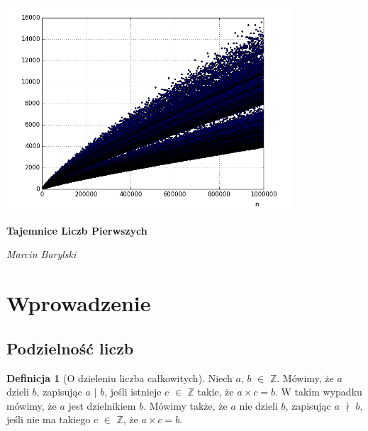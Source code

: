 \documentclass[10pt,onecolumn]{article}
\theoremstyle{definition}
\newtheorem{definition}{Definicja}
\theoremstyle{hypothesis}
\theoremstyle{capability}
\begin{document}

\begin{titlepage}
	\centering
	\includegraphics[width=0.8\textwidth]{title_page}\par\vspace{1cm}
	\vspace{1.5cm}
	{\huge\bfseries Tajemnice Liczb Pierwszych\par}
	\vspace{2cm}
	{\Large\itshape Marcin Barylski\par}
	\vfill

\title{}
\end{titlepage}


\tableofcontents

\newpage


\section{Wprowadzenie}

\subsection{Podzielność liczb}

\begin{definition}[O dzieleniu liczba całkowitych]
Niech $a$, $b$ $\in$ $\mathbb{Z}$. Mówimy, że $a$ dzieli $b$, zapisując $a$ $\mid$ $b$, jeśli istnieje $c$ $\in$ $\mathbb{Z}$ takie, że $a \times c = b$. W takim wypadku mówimy, że $a$ jest dzielnikiem $b$. Mówimy także, że $a$ nie dzieli $b$, zapisując $a$ $\nmid$ $b$, jeśli nie ma takiego $c$ $\in$ $\mathbb{Z}$, że $a \times c = b$.
\end{definition}
\end{document}

